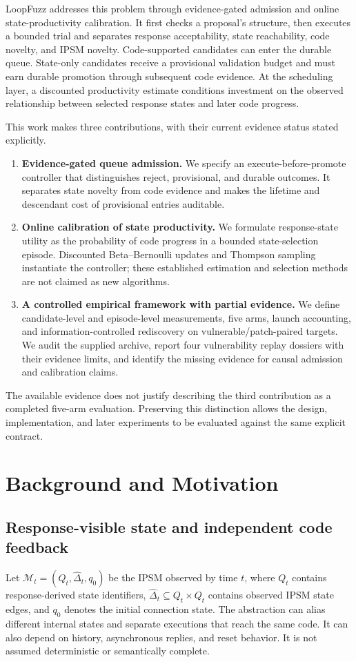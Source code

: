 \documentclass[final,5p,times,number]{elsarticle}
\begin{document}
LoopFuzz addresses this problem through evidence-gated admission and online state-productivity calibration. It first checks a proposal's structure, then executes a bounded trial and separates response acceptability, state reachability, code novelty, and IPSM novelty. Code-supported candidates can enter the durable queue. State-only candidates receive a provisional validation budget and must earn durable promotion through subsequent code evidence. At the scheduling layer, a discounted productivity estimate conditions investment on the observed relationship between selected response states and later code progress.

This work makes three contributions, with their current evidence status stated explicitly.
\begin{enumerate}
\item \textbf{Evidence-gated queue admission.} We specify an execute-before-promote controller that distinguishes reject, provisional, and durable outcomes. It separates state novelty from code evidence and makes the lifetime and descendant cost of provisional entries auditable.
\item \textbf{Online calibration of state productivity.} We formulate response-state utility as the probability of code progress in a bounded state-selection episode. Discounted Beta--Bernoulli updates and Thompson sampling instantiate the controller; these established estimation and selection methods are not claimed as new algorithms.
\item \textbf{A controlled empirical framework with partial evidence.} We define candidate-level and episode-level measurements, five arms, launch accounting, and information-controlled rediscovery on vulnerable/patch-paired targets. We audit the supplied archive, report four vulnerability replay dossiers with their evidence limits, and identify the missing evidence for causal admission and calibration claims.
\end{enumerate}
The available evidence does not justify describing the third contribution as a completed five-arm evaluation. Preserving this distinction allows the design, implementation, and later experiments to be evaluated against the same explicit contract.

\section{Background and Motivation}
\label{sec:motivation}
\subsection{Response-visible state and independent code feedback}
Let $\mathcal{M}_t=(Q_t,\widehat{\Delta}_t,q_0)$ be the IPSM observed by time $t$, where $Q_t$ contains response-derived state identifiers, $\widehat{\Delta}_t\subseteq Q_t\times Q_t$ contains observed IPSM state edges, and $q_0$ denotes the initial connection state. The abstraction can alias different internal states and separate executions that reach the same code. It can also depend on history, asynchronous replies, and reset behavior. It is not assumed deterministic or semantically complete.
\end{document}
